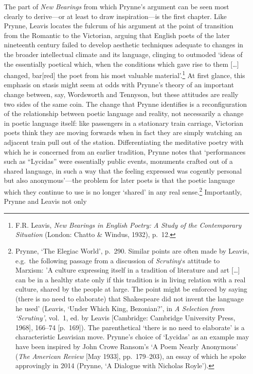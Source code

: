 \documentclass[]{article}
\begin{document}
\noindent The part of \emph{New Bearings} from which Prynne’s argument
can be seen most clearly to derive—or at least to draw inspiration—is
the first chapter. Like Prynne, Leavis locates the fulcrum of his
argument at the point of transition from the Romantic to the Victorian,
arguing that English poets of the later nineteenth century failed to
develop aesthetic techniques adequate to changes in the broader
intellectual climate and its language, clinging to outmoded ‘ideas of
the essentially poetical which, when the conditions which gave rise to
them {[}\ldots{}{]} changed, bar{[}red{]} the poet from his most
valuable material’.\footnote{F.R. Leavis, \emph{New Bearings in English
  Poetry: A Study of the Contemporary Situation} (London: Chatto \&
  Windus, 1932), p.~12.} At first glance, this emphasis on stasis might
seem at odds with Prynne’s theory of an important change between, say,
Wordsworth and Tennyson, but these attitudes are really two sides of the
same coin. The change that Prynne identifies is a reconfiguration of the
relationship between poetic language and reality, not necessarily a
change in poetic language itself: like passengers in a stationary train
carriage, Victorian poets think they are moving forwards when in fact
they are simply watching an adjacent train pull out of the station.
Differentiating the meditative poetry with which he is concerned from an
earlier tradition, Prynne notes that ‘performances such as “Lycidas”
were essentially public events, monuments crafted out of a shared
language, in such a way that the feeling expressed was cogently personal
but also anonymous’—the problem for later poets is that the poetic
language which they continue to use is no longer ‘shared’ in any real
sense.\footnote{Prynne, ‘The Elegiac World’, p.~290. Similar points are
  often made by Leavis, e.g.~the following passage from a discussion of
  \emph{Scrutiny}‘s attitude to Marxism: ’A culture expressing itself in
  a tradition of literature and art {[}\ldots{}{]} can be in a healthy
  state only if this tradition is in living relation with a real
  culture, shared by the people at large. The point might be enforced by
  saying (there is no need to elaborate) that Shakespeare did not invent
  the language he used’ (Leavis, ‘Under Which King, Bezonian?’, in
  \emph{A Selection from ‘Scrutiny’}, vol.~1, ed. by Leavis
  {[}Cambridge: Cambridge University Press, 1968{]}, 166–74
  {[}p.~169{]}). The parenthetical ‘there is no need to elaborate’ is a
  characteristic Leavisian move. Prynne’s choice of ‘Lycidas’ as an
  example may have been inspired by John Crowe Ransom’s ‘A Poem Nearly
  Anonymous’ (\emph{The American Review} {[}May 1933{]}, pp.~179–203),
  an essay of which he spoke approvingly in 2014 (Prynne, ‘A Dialogue
  with Nicholas Royle’).} Importantly, Prynne and Leavis not only
\end{document}
